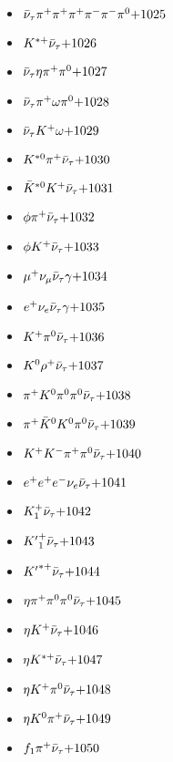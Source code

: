 \begin{multicols}{3}
\begin{itemize}
 \item $ \bar{\nu}_{\tau} \pi^{+} \pi^{+} \pi^{+} \pi^{-} \pi^{-} \pi^{0} \hfill{+1025}$
 \item $ K^{*+} \bar{\nu}_{\tau} \hfill{+1026}$
 \item $ \bar{\nu}_{\tau} \eta \pi^{+} \pi^{0} \hfill{+1027}$
 \item $ \bar{\nu}_{\tau} \pi^{+} \omega \pi^{0} \hfill{+1028}$
 \item $ \bar{\nu}_{\tau} K^{+} \omega \hfill{+1029}$
 \item $ K^{*0} \pi^{+} \bar{\nu}_{\tau} \hfill{+1030}$
 \item $ \bar{K}^{*0} K^{+} \bar{\nu}_{\tau} \hfill{+1031}$
 \item $ \phi \pi^{+} \bar{\nu}_{\tau} \hfill{+1032}$
 \item $ \phi K^{+} \bar{\nu}_{\tau} \hfill{+1033}$
 \item $ \mu^{+} \nu_{\mu} \bar{\nu}_{\tau} \gamma \hfill{+1034}$
 \item $ e^{+} \nu_{e} \bar{\nu}_{\tau} \gamma \hfill{+1035}$
 \item $ K^{+} \pi^{0} \bar{\nu}_{\tau} \hfill{+1036}$
 \item $ K^{0} \rho^{+} \bar{\nu}_{\tau} \hfill{+1037}$
 \item $ \pi^{+} K^{0} \pi^{0} \pi^{0} \bar{\nu}_{\tau} \hfill{+1038}$
 \item $ \pi^{+} \bar{K}^{0} K^{0} \pi^{0} \bar{\nu}_{\tau} \hfill{+1039}$
 \item $ K^{+} K^{-} \pi^{+} \pi^{0} \bar{\nu}_{\tau} \hfill{+1040}$
 \item $ e^{+} e^{+} e^{-} \nu_{e} \bar{\nu}_{\tau} \hfill{+1041}$
 \item $ K_{1}^{+} \bar{\nu}_{\tau} \hfill{+1042}$
 \item $ {K^{\prime}}_{1}^{+} \bar{\nu}_{\tau} \hfill{+1043}$
 \item $ {K^{\prime}}^{*+} \bar{\nu}_{\tau} \hfill{+1044}$
 \item $ \eta \pi^{+} \pi^{0} \pi^{0} \bar{\nu}_{\tau} \hfill{+1045}$
 \item $ \eta K^{+} \bar{\nu}_{\tau} \hfill{+1046}$
 \item $ \eta K^{*+} \bar{\nu}_{\tau} \hfill{+1047}$
 \item $ \eta K^{+} \pi^{0} \bar{\nu}_{\tau} \hfill{+1048}$
 \item $ \eta K^{0} \pi^{+} \bar{\nu}_{\tau} \hfill{+1049}$
 \item $ f_{1} \pi^{+} \bar{\nu}_{\tau} \hfill{+1050}$
 \end{itemize} 
 \end{multicols} 
